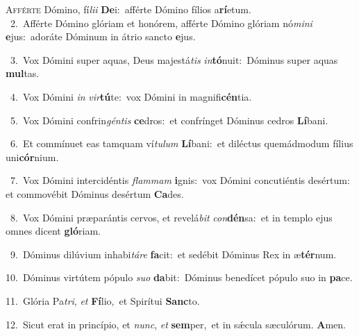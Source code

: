 \lettrine{\initial\textcolor{\initialcolor}{A}}{fférte} Dómino, fí\-\textit{li}\-\textit{i} \textbf{De}\-i:~\star afférte Dómino fílios a\-\textbf{rí}\-etum.\\
{\numbfont\textcolor{\numbcolor}{~2.}}~Afférte Dómino glóriam et honórem, afférte Dómino glóriam nó\-\textit{mi}\-\textit{ni} \textbf{e}\-jus:~\star adoráte Dóminum in átrio sancto \textbf{e}\-jus.\par
{\numbfont\textcolor{\numbcolor}{~3.}}~Vox Dómini super aquas, Deus majestá\textit{tis} \textit{in}\-\textbf{tó}nuit:~\star Dóminus super aquas \textbf{mul}\-tas.\par
{\numbfont\textcolor{\numbcolor}{~4.}}~Vox Dómini \textit{in} \textit{vir}\-\textbf{tú}te:~\star vox Dómini in magnifi\-\textbf{cén}\-tia.\par
{\numbfont\textcolor{\numbcolor}{~5.}}~Vox Dómini confrin\-\textit{gén}\-\textit{tis} \textbf{ce}\-dros:~\star et confrínget Dóminus cedros \textbf{Lí}\-bani.\par
{\numbfont\textcolor{\numbcolor}{~6.}}~Et commínuet eas tamquam ví\-\textit{tu}\-\textit{lum} \textbf{Lí}\-bani:~\star et diléctus quemádmodum fílius uni\-\textbf{cór}\-nium.\par
{\numbfont\textcolor{\numbcolor}{~7.}}~Vox Dómini intercidéntis \textit{flam}\-\textit{mam} \textbf{i}\-gnis:~\star vox Dómini concutiéntis desértum: et commovébit Dóminus desértum \textbf{Ca}\-des.\par
{\numbfont\textcolor{\numbcolor}{~8.}}~Vox Dómini præparántis cervos, et revelá\textit{bit} \textit{con}\-\textbf{dén}sa:~\star et in templo ejus omnes dicent \textbf{gló}\-riam.\par
{\numbfont\textcolor{\numbcolor}{~9.}}~Dóminus dilúvium inhabi\-\textit{tá}\-\textit{re} \textbf{fa}\-cit:~\star et sedébit Dóminus Rex in æ\-\textbf{tér}\-num.\par
{\numbfont\textcolor{\numbcolor}{10.}}~Dóminus virtútem pópulo \textit{su}\-\textit{o} \textbf{da}\-bit:~\star Dóminus benedícet pópulo suo in \textbf{pa}\-ce.\par
{\numbfont\textcolor{\numbcolor}{11.}}~Glória Pa\-\textit{tri}\-, \textit{et} \textbf{Fí}\-lio,~\star et Spirítui \textbf{Sanc}\-to.\par
{\numbfont\textcolor{\numbcolor}{12.}}~Sicut erat in princípio, et \textit{nunc}\-, \textit{et} \textbf{sem}\-per,~\star et in sǽcula sæculórum. \textbf{A}\-men.\par
